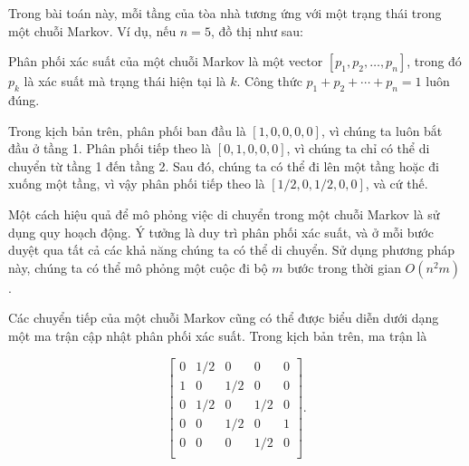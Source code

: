 Trong bài toán này, mỗi tầng của tòa nhà
tương ứng với một trạng thái trong một chuỗi Markov.
Ví dụ, nếu $n=5$, đồ thị như sau:

\begin{center}
\end{center}

Phân phối xác suất
của một chuỗi Markov là một vector
$[p_1,p_2,\ldots,p_n]$, trong đó $p_k$ là
xác suất mà trạng thái hiện tại là $k$.
Công thức $p_1+p_2+\cdots+p_n=1$ luôn đúng.

Trong kịch bản trên, phân phối ban đầu là
$[1,0,0,0,0]$, vì chúng ta luôn bắt đầu ở tầng 1.
Phân phối tiếp theo là $[0,1,0,0,0]$,
vì chúng ta chỉ có thể di chuyển từ tầng 1 đến tầng 2.
Sau đó, chúng ta có thể đi lên một tầng
hoặc đi xuống một tầng, vì vậy phân phối tiếp theo là
$[1/2,0,1/2,0,0]$, và cứ thế.

Một cách hiệu quả để mô phỏng việc di chuyển trong
một chuỗi Markov là sử dụng quy hoạch động.
Ý tưởng là duy trì phân phối xác suất,
và ở mỗi bước duyệt qua tất cả các khả năng
chúng ta có thể di chuyển.
Sử dụng phương pháp này, chúng ta có thể mô phỏng
một cuộc đi bộ $m$ bước trong thời gian $O(n^2 m)$.

Các chuyển tiếp của một chuỗi Markov cũng có thể được
biểu diễn dưới dạng một ma trận cập nhật
phân phối xác suất.
Trong kịch bản trên, ma trận là

\[ 
 \begin{bmatrix}
  0 & 1/2 & 0 & 0 & 0 \\
  1 & 0 & 1/2 & 0 & 0 \\
  0 & 1/2 & 0 & 1/2 & 0 \\
  0 & 0 & 1/2 & 0 & 1 \\
  0 & 0 & 0 & 1/2 & 0 \\
 \end{bmatrix}.
\]

